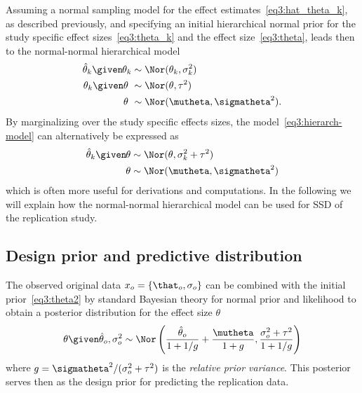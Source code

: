 Assuming a normal sampling model for the effect
estimates~\eqref{eq3:hat_theta_k}, as described previously, and specifying an
initial hierarchical normal prior for the study specific effect
sizes~\eqref{eq3:theta_k} and the effect size~\eqref{eq3:theta}, leads then to the
normal-normal hierarchical model
\begin{subequations}
\label{eq3:hierarch-model}
\begin{align}
  \hat{\theta}_k \given \mspace{-1mu} \theta_k &\sim \Nor(\theta_k, \sigma_k^2)
  \label{eq3:hat_theta_k} \\
  \theta_k \given \theta \,\,  &\sim \Nor(\theta, \tau^2) \label{eq3:theta_k} \\
  \theta \,\, &\sim \Nor(\mutheta,
  \sigmatheta^2). \label{eq3:theta}
\end{align}
\end{subequations}
By marginalizing over the study specific effects sizes, the
model~\eqref{eq3:hierarch-model} can alternatively be expressed as
\begin{subequations}
\label{eq3:hierarch-model2}
\begin{align}
  \hat{\theta}_k \given \mspace{-1mu} \theta &\sim \Nor(\theta, \sigma_k^2 + \tau^{2})
  \label{eq3:hat_theta_k2} \\
  \theta  &\sim \Nor(\mutheta,
  \sigmatheta^2) \label{eq3:theta2}
\end{align}
\end{subequations}
which is often more useful for derivations and computations. In the following we
will explain how the normal-normal hierarchical model can be used
for SSD of the replication study.

\subsection{Design prior and predictive distribution}
\label{sec3:designpredictive}
The observed original data $x_{o} = \{\that_{o}, \sigma_{o}\}$ can be combined
with the initial prior~\eqref{eq3:theta2} %
by standard Bayesian theory for normal prior and likelihood \citep[ch.
3.7]{Spiegelhalter2004} to obtain a posterior distribution for the effect size
$\theta$
\begin{align}
  \label{eq3:dpnormal}
  \theta \given \hat{\theta}_o, \sigma^2_o
  \sim
  \Nor\left(
  \frac{\hat{\theta}_o}{1 + 1/g} + \frac{\mutheta}{1 + g},
  \frac{\sigma^2_o + \tau^2}{1 + 1/g} \right)
\end{align}
where $g = \sigmatheta^2/(\sigma^2_o + \tau^2)$ is the \emph{relative prior
  variance}. This posterior serves then as the design prior for predicting the
replication data.

